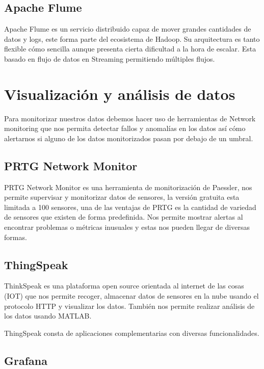 \subsection{Apache Flume}

Apache Flume es un servicio distribuido capaz de mover grandes cantidades de datos y logs, este forma parte del ecosistema de Hadoop. Su arquitectura es tanto flexible cómo sencilla aunque presenta cierta dificultad a la hora de escalar. Esta basado en flujo de datos en Streaming permitiendo múltiples flujos.\cite{pagina:Flume}
\section{Visualización y análisis de datos}

Para monitorizar nuestros datos debemos hacer uso de herramientas de Network monitoring que nos permita detectar fallos y anomalías en los datos así cómo alertarnos si alguno de los datos monitorizados pasan por debajo de un umbral.

\subsection{PRTG Network Monitor}

PRTG Network Monitor es una herramienta de monitorización de Paessler, nos permite supervisar y monitorizar datos de sensores,  la versión gratuita esta limitada a 100 sensores, una de las ventajas de PRTG es la cantidad de variedad de sensores que existen de forma predefinida. Nos permite mostrar alertas al encontrar problemas o métricas inusuales y estas nos pueden llegar de diversas formas.\cite{pagina:PRTG}

\subsection{ThingSpeak}

ThinkSpeak es una plataforma open source orientada al internet de las cosas (IOT) que nos permite recoger, almacenar datos de sensores en la nube usando el protocolo HTTP y visualizar los datos. También nos permite realizar análisis de los datos usando MATLAB. 

ThingSpeak consta de aplicaciones complementarias con diversas funcionalidades. \cite{pagina:ThingSpeak}

\subsection{Grafana}

